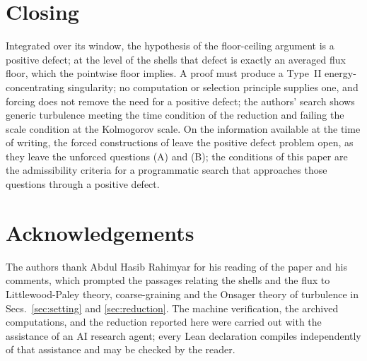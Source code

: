 \documentclass[letterpaper,twocolumn]{article}
\begin{document}
\section{Closing}
\label{sec:closing}

Integrated over its window, the hypothesis of the floor-ceiling argument
is a positive defect; at the level of the shells that defect is exactly
an averaged flux floor, which the pointwise floor implies. A proof must produce a
Type~II energy-concentrating singularity; no computation or selection
principle supplies one, and forcing does not remove the need for a
positive defect; the authors' search shows generic turbulence meeting the
time condition of the reduction and failing the scale condition at the
Kolmogorov scale. On the information available at the time of writing, the
forced constructions of \cite{OpenAI26NS,AlpBuc26} leave the positive
defect problem open, as they leave the unforced questions (A) and (B); the
conditions of this paper are the admissibility criteria for a programmatic
search that approaches those questions through a positive defect.

\section{Acknowledgements}

The authors thank Abdul Hasib Rahimyar for his reading of the paper and
his comments, which prompted the passages relating the shells and the
flux to Littlewood-Paley theory, coarse-graining and the Onsager theory
of turbulence in Secs.~\ref{sec:setting} and \ref{sec:reduction}.
The machine verification, the archived computations, and the reduction
reported here were carried out with the assistance of an AI research
agent; every Lean declaration compiles independently of that assistance
and may be checked by the reader. 


{\footnotesize}
\end{document}
